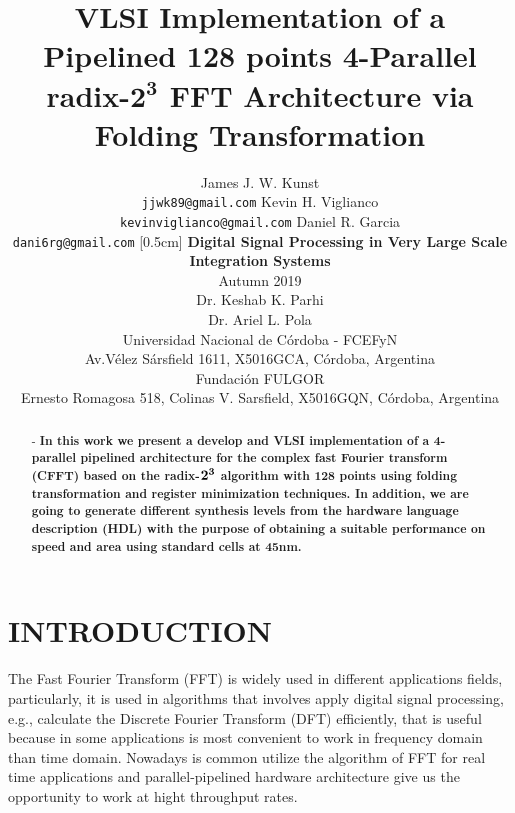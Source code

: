 \documentclass[journal,comsoc]{IEEEtran}
\begin{document}
\title{
\huge \bf VLSI Implementation of a Pipelined 128 points 4-Parallel radix-$\mathbf{2^3}$ FFT Architecture via Folding Transformation
}
\author{
James J. W. Kunst   \\{\tt\small jjwk89@gmail.com}		
Kevin H. Viglianco	\\{\tt\small kevinviglianco@gmail.com}	 
Daniel R. Garcia	\\{\tt\small dani6rg@gmail.com}		
[0.5cm]
{\large \bf Digital Signal Processing in Very Large Scale Integration Systems}\\
[0.5cm]
Autumn 2019\\
[0.5cm]
Dr. Keshab K. Parhi	\\
Dr. Ariel L. Pola	\\
[0.5cm]
Universidad Nacional de Córdoba - FCEFyN\\
Av.Vélez Sársfield 1611, X5016GCA, C\'ordoba, Argentina\\
[0.5cm]
Fundación FULGOR\\
Ernesto Romagosa 518, Colinas V. Sarsfield, X5016GQN, Córdoba, Argentina         
}
\maketitle


\begin{abstract} - \bf In this work we present a develop and VLSI implementation of a 4-parallel pipelined architecture for the complex fast Fourier transform (CFFT) based on the radix-$\bf 2^3$ algorithm with 128 points using folding transformation and register minimization techniques. In addition, we are going to generate different synthesis levels from the hardware language description (HDL) with the purpose of obtaining a suitable performance on speed and area using standard cells at 45nm. %
\end{abstract}
\section{INTRODUCTION}
The Fast Fourier Transform (FFT) is widely used in different applications fields, particularly, it is used in algorithms that involves apply digital signal processing, e.g., calculate the Discrete Fourier Transform (DFT) efficiently, that is useful because in some applications is most convenient to work in frequency domain than time domain. Nowadays is common utilize the algorithm of FFT for real time applications and parallel-pipelined hardware architecture give us the opportunity to work at hight throughput rates.
\end{document}
